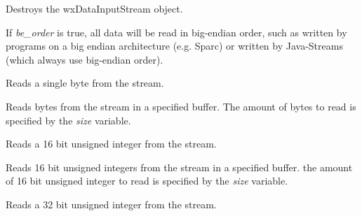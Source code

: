 


\label{wxdatainputstreamdtor}


Destroys the wxDataInputStream object.

\label{wxdatainputstreambigendianordered}


If {\it be\_order} is true, all data will be read in big-endian
order, such as written by programs on a big endian architecture 
(e.g. Sparc) or written by Java-Streams (which always use 
big-endian order).
  
\label{wxdatainputstreamread8}


Reads a single byte from the stream.


Reads bytes from the stream in a specified buffer. The amount of
bytes to read is specified by the {\it size} variable.

\label{wxdatainputstreamread16}


Reads a 16 bit unsigned integer from the stream.


Reads 16 bit unsigned integers from the stream in a specified buffer. the
amount of 16 bit unsigned integer to read is specified by the {\it size} variable.

\label{wxdatainputstreamread32}


Reads a 32 bit unsigned integer from the stream.

